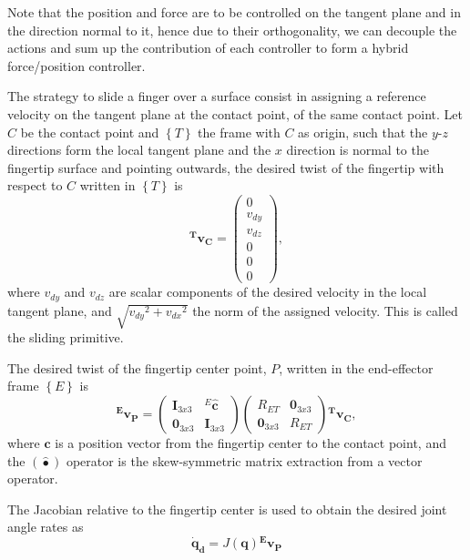 Note that the position and force are to be controlled on the tangent plane and in the direction normal to it, hence due to their orthogonality, we can decouple the actions and sum up the contribution of each controller to form a hybrid force/position controller.

The strategy to slide a finger over a surface consist in assigning a reference velocity on the tangent plane at the contact point, of the same contact point. Let $C$ be the contact point and $\left\lbrace T \right\rbrace$ the frame with $C$ as origin, such that the $y$-$z$ directions form the local tangent plane and the $x$ direction is normal to the fingertip surface and pointing outwards, the desired twist of the fingertip with respect to $C$ written in $\left\lbrace T \right\rbrace$ is
\begin{equation}
    \bm{^Tv_C}=\left(
    \begin{matrix}
        0\\
        v_{dy}\\
        v_{dz}\\
        0\\
        0\\
        0
    \end{matrix}\right),
\end{equation}
where $v_{dy}$ and $v_{dz}$ are scalar components of the desired velocity in the local tangent plane, and $\sqrt{{v_{dy}}^2+{v_{dx}}^2}$ the norm of the assigned velocity. This is called the sliding primitive.

The desired twist of the fingertip center point, $P$, written in the end-effector frame $\left\lbrace E \right\rbrace$ is
\begin{equation}
\bm{^Ev_P}=\left(
    \begin{array}{cc}
       \bm{I}_{3x3} & ^E\hat{\bm{c}} \\
       \bm{0}_{3x3} & \bm{I}_{3x3}
    \end{array}
    \right)
    \left(
    \begin{array}{cc}
        R_{ET} & \bm{0}_{3x3} \\
        \bm{0}_{3x3} & R_{ET}
    \end{array}
    \right)
    \bm{{^Tv_C}},
\end{equation}
where $\bm{c}$ is a position vector from the fingertip center to the contact point, and the $\left(\hat{•}\right)$ operator is the skew-symmetric matrix extraction from a vector operator.

The Jacobian relative to the fingertip center is used to obtain the desired joint angle rates as
\begin{equation}
    \bm{\dot{q}_d}=J(\bm{q})\bm{^Ev_P}
\end{equation}

